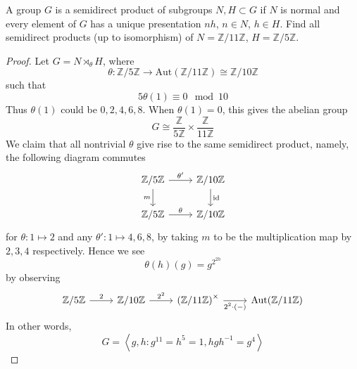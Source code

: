 \documentclass[openany]{book}
\newcommand{\Z}{\mathbb{Z}}
\newcommand{\la}{\langle}
\newcommand{\ra}{\rangle}
\begin{document}
\begin{prob}
    A group \(G\) is a semidirect product of subgroups \(N,H\subset G\) if \(N\) is normal and every element of \(G\) has a unique presentation \(nh\), \(n\in N\), \(h\in H\). Find all semidirect products (up to isomorphism) of \(N=\mathbb{Z}/11\mathbb{Z}\), \(H=\mathbb{Z}/5\mathbb{Z}\).
\end{prob}
\begin{proof}
    Let $G=N\rtimes_\theta H$, where 
    \begin{equation*}
        \theta: \Z/5\Z\to \text{Aut}(\Z/11\Z)\cong\Z/10\Z
    \end{equation*}
    such that
    \begin{equation*}
        5\theta(1)\equiv 0\mod 10
    \end{equation*}
    Thus $\theta(1)$ could be $0, 2,4,6,8$. When $\theta(1)=0$, this gives the abelian group 
    \begin{equation*}
        G\cong\frac{\Z}{5\Z}\times\frac{\Z}{11\Z}
    \end{equation*}
    We claim that all nontrivial $\theta$ give rise to the same semidirect product, namely, the following diagram commutes
    \[\begin{tikzcd}
        {\Z/5\Z} & {\Z/10\Z} \\
        {\Z/5\Z} & {\Z/10\Z}
        \arrow["{\theta'}", from=1-1, to=1-2]
        \arrow["m"', from=1-1, to=2-1]
        \arrow["{\text{id}}", from=1-2, to=2-2]
        \arrow["\theta", from=2-1, to=2-2]
    \end{tikzcd}\]
    for $\theta: 1\mapsto 2$ and any $\theta': 1\mapsto 4, 6, 8$, by taking $m$ to be the multiplication map by $2,3,4$ respectively. Hence we see 
    \begin{equation*}
        \theta(h)(g)=g^{2^{2h}}
    \end{equation*}
    by observing 
    \[\begin{tikzcd}
        {\Z/5\Z} & {\Z/10\Z} & {\left(\Z/11\Z\right)^\times} & {\text{Aut}(\Z/11\Z)}
        \arrow["2", from=1-1, to=1-2]
        \arrow["{2^2}", from=1-2, to=1-3]
        \arrow["{2^2\cdot(-)}"', from=1-3, to=1-4]
    \end{tikzcd}\]
    In other words,
    \begin{equation*}
        G=\left\la g,h: g^{11}=h^5=1, hgh^{-1}=g^{4}\right\ra
    \end{equation*}
\end{proof}
\end{document}
